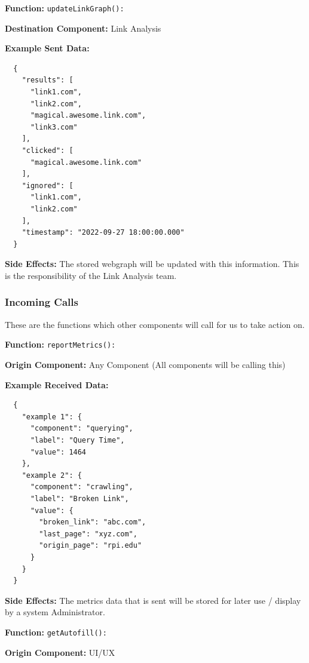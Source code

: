 \textbf{Function:} \verb|updateLinkGraph():|

\smallskip

\textbf{Destination Component:} Link Analysis

\smallskip

\textbf{Example Sent Data:} \begin{verbatim}
  {
    "results": [
      "link1.com",
      "link2.com", 
      "magical.awesome.link.com",
      "link3.com"
    ],
    "clicked": [
      "magical.awesome.link.com"
    ],
    "ignored": [
      "link1.com",
      "link2.com"
    ],
    "timestamp": "2022-09-27 18:00:00.000"
  }
\end{verbatim}

\smallskip

\textbf{Side Effects:} The stored webgraph will be updated with this information. This is the responsibility of the Link Analysis team. 

\subsubsection*{Incoming Calls}
These are the functions which other components will call for us to take action on.

\textbf{Function:} \verb|reportMetrics():|

\smallskip

\textbf{Origin Component:} Any Component (All components will be calling this)

\smallskip

\textbf{Example Received Data:} \begin{verbatim}
  {
    "example 1": {
      "component": "querying",
      "label": "Query Time",
      "value": 1464
    },
    "example 2": {
      "component": "crawling",
      "label": "Broken Link",
      "value": {
        "broken_link": "abc.com",
        "last_page": "xyz.com",
        "origin_page": "rpi.edu"
      }
    }
  }
\end{verbatim}

\smallskip

\textbf{Side Effects:} The metrics data that is sent will be stored for later use / display by a system Administrator.

\bigskip

\textbf{Function:} \verb|getAutofill():|

\smallskip

\textbf{Origin Component:} UI/UX

\smallskip


